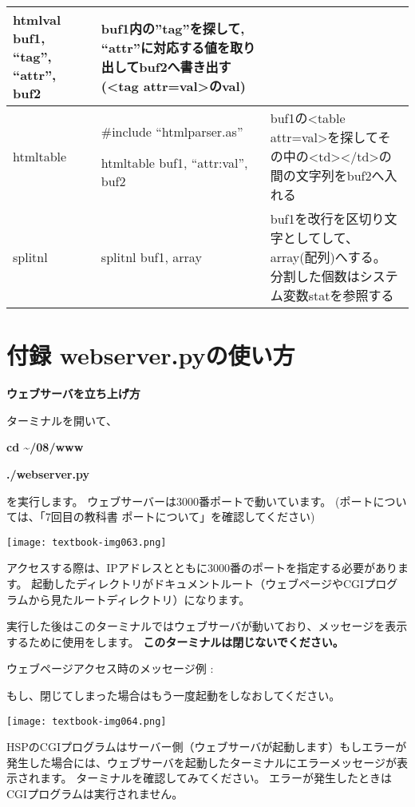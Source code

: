 \begin{center}
\begin{supertabular}{|m{2.349cm}|m{7.57cm}|m{6.487cm}|}
htmlval buf1, “tag”, “attr”, buf2 &
buf1内の”tag”を探して,
“attr”に対応する値を取り出してbuf2へ書き出す({\textless}tag
attr=val{\textgreater}のval)\\\hline
htmltable &
\#include “htmlparser.as”

htmltable buf1, “attr:val”, buf2 &
buf1の{\textless}table
attr=val{\textgreater}を探してその中の{\textless}td{\textgreater}{\textless}/td{\textgreater}の間の文字列をbuf2へ入れる\\\hline
splitnl &
splitnl buf1, array &
buf1を改行を区切り文字としてして、array(配列)へする。
分割した個数はシステム変数statを参照する\\\hline
\end{supertabular}
\end{center}


\section{付録 webserver.pyの使い方}
{\bfseries ウェブサーバを立ち上げ方}

ターミナルを開いて、

\textbf{cd {\textasciitilde}/08/www}

\textbf{./webserver.py}

を実行します。
ウェブサーバーは3000番ポートで動いています。
(ポートについては、「7回目の教科書
ポートについて」を確認してください)%

\begin{center}
	\texttt{[image: textbook-img063.png]}
\end{center}
アクセスする際は、IPアドレスとともに3000番のポートを指定する必要があります。
起動したディレクトリがドキュメントルート（ウェブページやCGIプログラムから見たルートディレクトリ）になります。

実行した後はこのターミナルではウェブサーバが動いており、メッセージを表示するために使用をします。
\textbf{このターミナルは閉じないでください。}

ウェブページアクセス時のメッセージ例
:

もし、閉じてしまった場合はもう一度起動をしなおしてください。

\begin{center}
	\texttt{[image: textbook-img064.png]}
\end{center}
HSPのCGIプログラムはサーバー側（ウェブサーバが起動します）もしエラーが発生した場合には、ウェブサーバを起動したターミナルにエラーメッセージが表示されます。
ターミナルを確認してみてください。
エラーが発生したときはCGIプログラムは実行されません。

